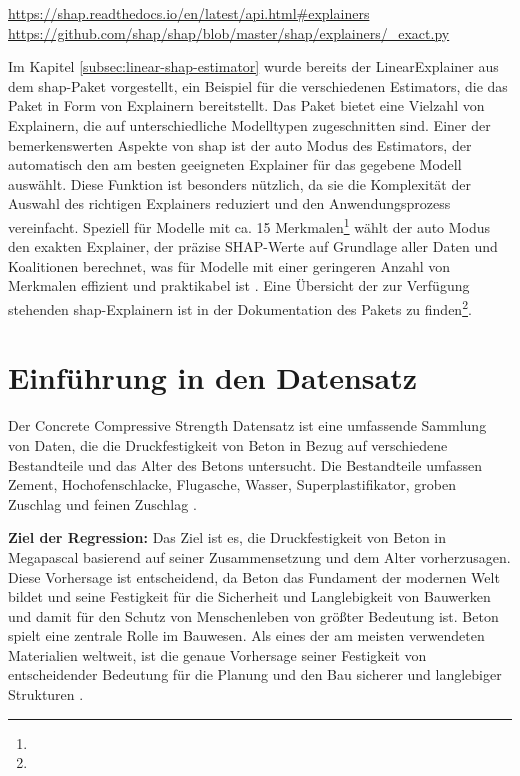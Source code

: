 \urldef{\shapurl}\url{https://shap.readthedocs.io/en/latest/api.html#explainers}
\urldef{\exacturl}\url{https://github.com/shap/shap/blob/master/shap/explainers/_exact.py}

Im Kapitel \ref{subsec:linear-shap-estimator} wurde bereits der LinearExplainer aus dem \textsf{shap}-Paket 
vorgestellt, ein Beispiel für die verschiedenen Estimators, die das Paket in Form von Explainern bereitstellt. 
Das Paket bietet eine Vielzahl von Explainern, die auf unterschiedliche Modelltypen zugeschnitten sind. 
Einer der bemerkenswerten Aspekte von \textsf{shap} ist der auto Modus des Estimators, 
der automatisch den am besten geeigneten Explainer für das gegebene Modell auswählt. 
Diese Funktion ist besonders nützlich, da sie die Komplexität der Auswahl des richtigen Explainers 
reduziert und den Anwendungsprozess vereinfacht. Speziell für Modelle mit ca. 15 Merkmalen\footnote{\exacturl} wählt der 
auto Modus den exakten Explainer, der präzise SHAP-Werte auf Grundlage aller Daten und Koalitionen berechnet, was für Modelle mit einer geringeren Anzahl 
von Merkmalen effizient und praktikabel ist \cite[S. 40f]{Molnar_2023}. Eine Übersicht der zur Verfügung stehenden \textsf{shap}-Explainern ist in der
Dokumentation des Pakets zu finden\footnote{\shapurl}. 


\section{Einführung in den Datensatz}


Der Concrete Compressive Strength Datensatz ist eine umfassende Sammlung von Daten, 
die die Druckfestigkeit von Beton in Bezug auf verschiedene Bestandteile und das Alter des Betons untersucht. 
Die Bestandteile umfassen Zement, Hochofenschlacke, Flugasche, Wasser, Superplastifikator, 
groben Zuschlag und feinen Zuschlag \cite{misc_concrete_compressive_strength_165}.

\textbf{Ziel der Regression:} Das Ziel ist es, die Druckfestigkeit von Beton in Megapascal basierend 
auf seiner Zusammensetzung und dem Alter vorherzusagen. Diese Vorhersage ist entscheidend, 
da Beton das Fundament der modernen Welt bildet und seine Festigkeit für die Sicherheit und 
Langlebigkeit von Bauwerken und damit für den Schutz von Menschenleben von größter Bedeutung ist.
Beton spielt eine zentrale Rolle im Bauwesen. Als eines der am meisten verwendeten Materialien weltweit, 
ist die genaue Vorhersage seiner Festigkeit von entscheidender 
Bedeutung für die Planung und den Bau sicherer und langlebiger Strukturen \cite[S. 1]{Nandhini2021}.

